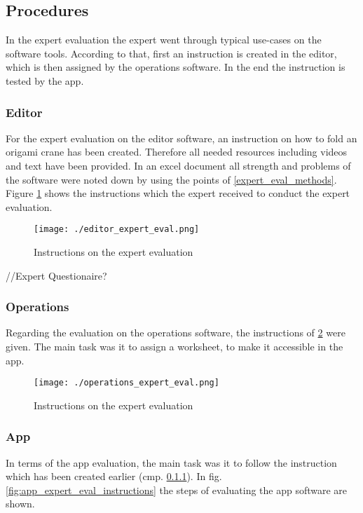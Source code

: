 \documentclass[]{article}
\begin{document}
\subsection{Procedures}
In the expert evaluation the expert went through typical use-cases on the software tools. According to that, first an instruction is created in the editor, which is then assigned by the operations software. In the end the instruction is tested by the app.

\subsubsection{Editor} \label{editor_expert_eval}
For the expert evaluation on the editor software, an instruction on how to fold an origami crane has been created. Therefore all needed resources including videos and text have been provided. In an excel document all strength and problems of the software were noted down by using the points of \ref{expert_eval_methods}.
Figure \ref{fig:editor_expert_eval_instructions} shows the instructions which the expert received to conduct the expert evaluation. 
\begin{figure}[h!tb]
	\centering
	\texttt{[image: ./editor\_expert\_eval.png]}
	\caption{Instructions on the expert evaluation}
	\label{fig:editor_expert_eval_instructions}
\end{figure}

\noindent //Expert Questionaire?
\subsubsection{Operations}
Regarding the evaluation on the operations software, the instructions of \ref{fig:operations_expert_eval_instructions} were given. The main task was it to assign a worksheet, to make it accessible in the app.
\begin{figure}[h!tb]
	\centering
	\texttt{[image: ./operations\_expert\_eval.png]}
	\caption{Instructions on the expert evaluation}
	\label{fig:operations_expert_eval_instructions}
\end{figure}

\subsubsection{App}
In terms of the app evaluation, the main task was it to follow the instruction which has been created earlier (cmp. \ref{editor_expert_eval}). In fig. \ref{fig:app_expert_eval_instructions} the steps of evaluating the app software are shown.
\end{document}
